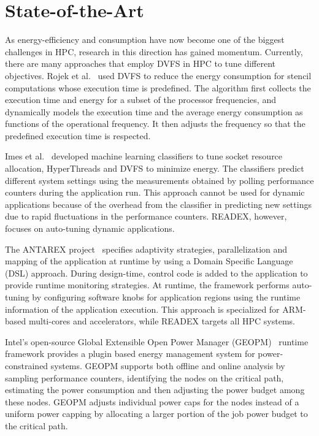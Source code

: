 \section{State-of-the-Art} \label{sec:related-work}
As energy-efficiency and consumption have now become one of the biggest challenges in HPC, research in this direction has gained momentum. Currently, there are many approaches that employ DVFS in HPC to tune different objectives. Rojek et al.~\cite{Rojek} used DVFS to reduce the energy consumption for stencil computations whose execution time is predefined. The algorithm first collects the execution time and energy for a subset of the processor frequencies, and dynamically models the execution time and the average energy consumption as functions of the operational frequency. It then adjusts the frequency so that the predefined execution time is respected.

Imes et al.~\cite{Imes} developed machine learning classifiers to tune socket resource allocation, HyperThreads and DVFS to minimize energy. The classifiers predict different system settings using the measurements obtained by polling performance counters during the application run. This approach cannot be used for dynamic applications because of the overhead from the classifier in predicting new settings due to rapid fluctuations in the performance counters. READEX, however, focuses on auto-tuning dynamic applications.
	
The ANTAREX project~\cite{silvano2016antarex} specifies adaptivity strategies, parallelization and mapping of the application at runtime by using a Domain Specific Language (DSL) approach. During design-time, control code is added to the application to provide runtime monitoring strategies. At runtime, the framework performs auto-tuning by configuring software knobs for application regions using the runtime information of the application execution. This approach is specialized for ARM-based multi-cores and accelerators, while READEX targets all HPC systems.

Intel's open-source Global Extensible Open Power Manager (GEOPM)~\cite{geopm} runtime framework provides a plugin based energy management system for power-constrained systems. GEOPM supports both offline and online analysis by sampling performance counters, identifying the nodes on the critical path, estimating the power consumption and then adjusting the power budget among these nodes. GEOPM adjusts individual power caps for the nodes instead of a uniform power capping by allocating a larger portion of the job power budget to the critical path. 
	
